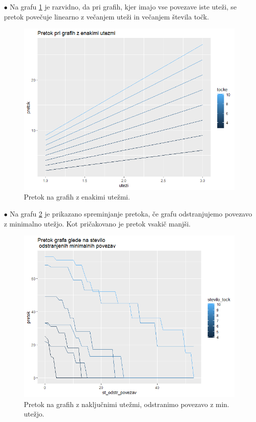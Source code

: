 \documentclass[a4paper]{article}
\begin{document}
$\bullet $  Na grafu \ref{fig2} je razvidno, da pri grafih, kjer imajo vse povezave iste uteži, se pretok povečuje linearno z večanjem uteži in večanjem števila točk. 
\begin{figure}[H]
\centerline{\includegraphics[scale=.5]{p1.PNG}}
\caption{Pretok na grafih z enakimi utežmi.}
\label{fig2}
\end{figure}


$\bullet $ Na grafu \ref{fig3} je prikazano spreminjanje pretoka, če grafu odstranjujemo povezavo z minimalno utežjo. Kot pričakovano je pretok vsakič manjši.  

\begin{figure}[H]
\centerline{\includegraphics[scale=.5]{p3.PNG}}
\caption{Pretok na grafih z naključnimi utežmi, odstranimo povezavo z min. utežjo. }
\label{fig3}
\end{figure}
\end{document}
